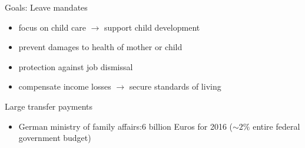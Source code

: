 \documentclass{beamer} %
\begin{document}
\begin{frame}
\begin{block}{Goals: Leave mandates}
\begin{itemize}
\item focus on child care $\rightarrow$ support child development
\item prevent damages to health of mother or child
\item protection against job dismissal
\item compensate income losses $\rightarrow$ secure standards of living
\end{itemize}
\end{block}\pause

\begin{block}{Large transfer payments}
\begin{itemize}
\item German ministry of family affairs:\newline $6$ billion Euros for 2016 ($\sim2\%$ entire federal government budget)
\end{itemize}
\end{block}

\end{frame}
\end{document}
